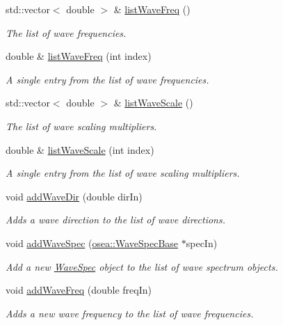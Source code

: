 \begin{DoxyCompactItemize}
std\-::vector$<$ double $>$ \& \hyperlink{classosea_1_1_sea_model_a5cb7dcbd8259134941de0b89dc0828e1}{list\-Wave\-Freq} ()
\begin{DoxyCompactList}\small\item\em The list of wave frequencies. \end{DoxyCompactList}\item 
double \& \hyperlink{classosea_1_1_sea_model_a5fbef3c5e1999a892d22a3c55f08cc06}{list\-Wave\-Freq} (int index)
\begin{DoxyCompactList}\small\item\em A single entry from the list of wave frequencies. \end{DoxyCompactList}\item 
std\-::vector$<$ double $>$ \& \hyperlink{classosea_1_1_sea_model_abce3f79ca26d193d561e7899f7511d39}{list\-Wave\-Scale} ()
\begin{DoxyCompactList}\small\item\em The list of wave scaling multipliers. \end{DoxyCompactList}\item 
double \& \hyperlink{classosea_1_1_sea_model_a92a246a023cfb0912e4016c0f071f91d}{list\-Wave\-Scale} (int index)
\begin{DoxyCompactList}\small\item\em A single entry from the list of wave scaling multipliers. \end{DoxyCompactList}\item 
void \hyperlink{classosea_1_1_sea_model_a78ebf3cff1f3f9f48108fc8e1706885c}{add\-Wave\-Dir} (double dir\-In)
\begin{DoxyCompactList}\small\item\em Adds a wave direction to the list of wave directions. \end{DoxyCompactList}\item 
void \hyperlink{classosea_1_1_sea_model_a52fc967aee53497c852898fae9b20b66}{add\-Wave\-Spec} (\hyperlink{classosea_1_1_wave_spec_base}{osea\-::\-Wave\-Spec\-Base} $\ast$spec\-In)
\begin{DoxyCompactList}\small\item\em Add a new \hyperlink{classosea_1_1_wave_spec}{Wave\-Spec} object to the list of wave spectrum objects. \end{DoxyCompactList}\item 
void \hyperlink{classosea_1_1_sea_model_af6729ff183dcb4222a92a29184232c26}{add\-Wave\-Freq} (double freq\-In)
\begin{DoxyCompactList}\small\item\em Adds a new wave frequency to the list of wave frequencies. \end{DoxyCompactList}\item 

\end{DoxyCompactItemize}
